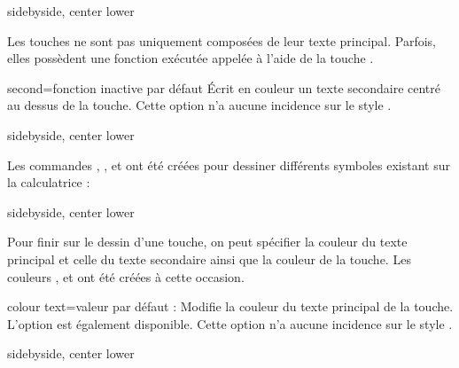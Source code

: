 \documentclass[10pt,french,a4paper]{article}
\newcommand*\Speciale{Cette option n'a aucune incidence sur le style \docValue{arrows}.\xspace}
\newcommand*\Couleur[1]{L'option \docAuxKey{color #1} est également disponible.\xspace}
\begin{document}
\begin{dispExample*}{sidebyside, center lower}
\TiC[style=arrows]
\TiC[style=general]
\TiC[style=arrows, raise=-0.25cm]
\end{dispExample*}
\medbreak

Les touches ne sont pas uniquement composées de leur texte principal. Parfois, elles possèdent une fonction exécutée appelée à l'aide de la touche
\TiC[principal=2nde, colour text=black, colour key=TIJaune, raise=-1ex].

\begin{docKey}{second}{=}{\sffamily fonction inactive par défaut}
    \'Ecrit en couleur un texte secondaire centré au dessus de la touche. \Speciale
\end{docKey}

\begin{dispExample*}{sidebyside, center lower}
\TiC[principal=suppr, second=insérer, position=1]
\end{dispExample*}
\medbreak

Les commandes , ,  et  ont été créées pour dessiner différents symboles existant sur la calculatrice :

\begin{dispExample*}{sidebyside, center lower}
\TiC[principal={\large :}, second=\Div]
\TiC[principal=$x^n$, second={\TiRacine[n]}]
\TiC[principal=$x^2$, second={\TiRacine}]
\TiC[principal=$-$, second=\ContrastDown]
\TiC[principal=$+$, second=\ContrastUp]
\end{dispExample*}
\medbreak

Pour finir sur le dessin d'une touche, on peut spécifier la couleur du texte principal et celle du texte secondaire ainsi que la couleur de la touche. Les couleurs ,  et  ont été créées à cette occasion.\medbreak

\begin{docKey}{colour text}{=}{valeur par défaut : }
    Modifie la couleur du texte principal de la touche. \Couleur{text} \Speciale
\end{docKey}

\begin{dispExample*}{sidebyside, center lower}
\TiC[principal=\textit{cos}, position=1, second=\textit{arccos}]
\TiC[principal=\textit{cos}, position=1, second=\textit{arccos}, colour text=black]
\end{dispExample*}
\medbreak
\end{document}
